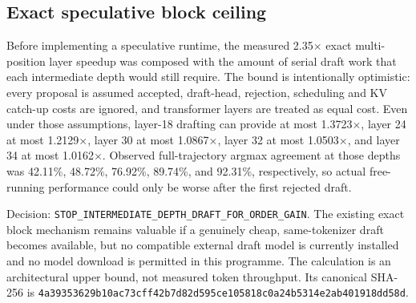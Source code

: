 \subsection{Exact speculative block ceiling}

Before implementing a speculative runtime, the measured 2.35$\times$ exact
multi-position layer speedup was composed with the amount of serial draft work
that each intermediate depth would still require.  The bound is intentionally
optimistic: every proposal is assumed accepted, draft-head, rejection,
scheduling and KV catch-up costs are ignored, and transformer layers are treated
as equal cost.  Even under those assumptions, layer-18 drafting can provide at
most 1.3723$\times$, layer 24 at most 1.2129$\times$, layer 30 at most
1.0867$\times$, layer 32 at most 1.0503$\times$, and layer 34 at most
1.0162$\times$.  Observed full-trajectory argmax agreement at those depths was
42.11\%, 48.72\%, 76.92\%, 89.74\%, and 92.31\%, respectively, so actual
free-running performance could only be worse after the first rejected draft.

Decision: \texttt{STOP\_INTERMEDIATE\_DEPTH\_DRAFT\_FOR\_ORDER\_GAIN}.  The
existing exact block mechanism remains valuable if a genuinely cheap,
same-tokenizer draft becomes available, but no compatible external draft model
is currently installed and no model download is permitted in this programme.
The calculation is an architectural upper bound, not measured token throughput.
Its canonical SHA-256 is
\texttt{4a39353629b10ac73cff42b7d82d595ce105818c0a24b5314e2ab401918dd58d}.
